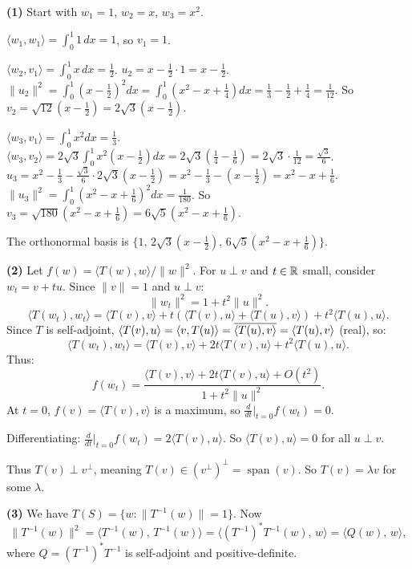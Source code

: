 \documentclass{report}
\begin{document}
\begin{solution}
\textbf{(1)} Start with \(w_1 = 1\), \(w_2 = x\), \(w_3 = x^2\).

\(\langle w_1, w_1 \rangle = \int_0^1 1 \, dx = 1\), so \(v_1 = 1\).

\(\langle w_2, v_1 \rangle = \int_0^1 x \, dx = \frac{1}{2}\).
\(u_2 = x - \frac{1}{2} \cdot 1 = x - \frac{1}{2}\).
\(\|u_2\|^2 = \int_0^1 (x - \frac{1}{2})^2 dx = \int_0^1 (x^2 - x + \frac{1}{4}) dx = \frac{1}{3} - \frac{1}{2} + \frac{1}{4} = \frac{1}{12}\).
So \(v_2 = \sqrt{12}(x - \frac{1}{2}) = 2\sqrt{3}(x - \frac{1}{2})\).

\(\langle w_3, v_1 \rangle = \int_0^1 x^2 dx = \frac{1}{3}\).
\(\langle w_3, v_2 \rangle = 2\sqrt{3} \int_0^1 x^2(x - \frac{1}{2}) dx = 2\sqrt{3}(\frac{1}{4} - \frac{1}{6}) = 2\sqrt{3} \cdot \frac{1}{12} = \frac{\sqrt{3}}{6}\).
\(u_3 = x^2 - \frac{1}{3} - \frac{\sqrt{3}}{6} \cdot 2\sqrt{3}(x - \frac{1}{2}) = x^2 - \frac{1}{3} - (x - \frac{1}{2}) = x^2 - x + \frac{1}{6}\).
\(\|u_3\|^2 = \int_0^1 (x^2 - x + \frac{1}{6})^2 dx = \frac{1}{180}\).
So \(v_3 = \sqrt{180}(x^2 - x + \frac{1}{6}) = 6\sqrt{5}(x^2 - x + \frac{1}{6})\).

The orthonormal basis is \(\{1, \, 2\sqrt{3}(x - \frac{1}{2}), \, 6\sqrt{5}(x^2 - x + \frac{1}{6})\}\).

\textbf{(2)} Let \(f(w) = \langle T(w), w \rangle / \|w\|^2\). For \(u \perp v\) and \(t \in \RR\) small, consider \(w_t = v + tu\). Since \(\|v\| = 1\) and \(u \perp v\):
\[\|w_t\|^2 = 1 + t^2 \|u\|^2.\]
\[\langle T(w_t), w_t \rangle = \langle T(v), v \rangle + t(\langle T(v), u \rangle + \langle T(u), v \rangle) + t^2 \langle T(u), u \rangle.\]
Since \(T\) is self-adjoint, \(\langle T(v), u \rangle = \langle v, T(u) \rangle = \overline{\langle T(u), v \rangle} = \langle T(u), v \rangle\) (real), so:
\[\langle T(w_t), w_t \rangle = \langle T(v), v \rangle + 2t \langle T(v), u \rangle + t^2 \langle T(u), u \rangle.\]
Thus:
\[f(w_t) = \frac{\langle T(v), v \rangle + 2t \langle T(v), u \rangle + O(t^2)}{1 + t^2 \|u\|^2}.\]
At \(t = 0\), \(f(v) = \langle T(v), v \rangle\) is a maximum, so \(\frac{d}{dt}|_{t=0} f(w_t) = 0\).

Differentiating: \(\frac{d}{dt}|_{t=0} f(w_t) = 2\langle T(v), u \rangle\). So \(\langle T(v), u \rangle = 0\) for all \(u \perp v\).

Thus \(T(v) \perp v^\perp\), meaning \(T(v) \in (v^\perp)^\perp = \operatorname{span}(v)\). So \(T(v) = \lambda v\) for some \(\lambda\).

\textbf{(3)} We have $T(S) = \{w : \|T^{-1}(w)\| = 1\}$. Now
\[
  \|T^{-1}(w)\|^2 = \langle T^{-1}(w),\, T^{-1}(w) \rangle = \langle (T^{-1})^* T^{-1}(w),\, w \rangle = \langle Q(w),\, w \rangle,
\]
where $Q = (T^{-1})^* T^{-1}$ is self-adjoint and positive-definite.


\end{solution}
\end{document}
